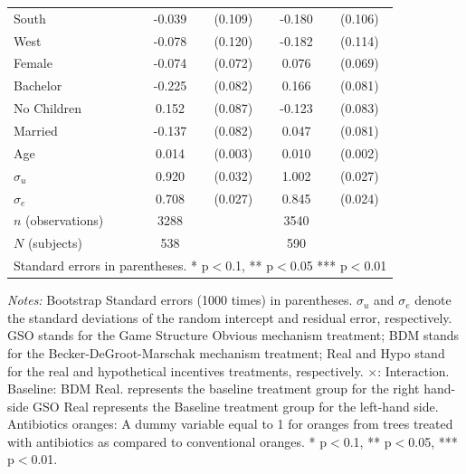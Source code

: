 \documentclass[12pt]{article}
\newcommand{\sym}[1]{\rlap{$^{#1}$}}
\begin{document}
\begin{table}[H]
{\begin{tabular}{l*{2}{cc}}
South       &      -0.039         &     (0.109)&	-0.180\sym{*}  &     (0.106)\\
West        &      -0.078         &     (0.120)&	-0.182         &     (0.114)\\
Female      &      -0.074         &     (0.072)&	0.076         &     (0.069)\\
Bachelor    &      -0.225\sym{***}&     (0.082)&	0.166\sym{**} &     (0.081)\\
No Children &       0.152\sym{*}  &     (0.087)&	-0.123         &     (0.083)\\
Married     &      -0.137\sym{*}  &     (0.082)&	0.047         &     (0.081)\\
Age         &       0.014\sym{***}&     (0.003)&	0.010\sym{***}&     (0.002)\\
$\sigma_u$     &       0.920\sym{***}&     (0.032)&	1.002\sym{***}&     (0.027)\\
$\sigma_e$   &       0.708\sym{***}&     (0.027)&	0.845\sym{***}&     (0.024)\\
\hline
\(n\) (observations)    &        3288         &            &        3540         &            \\
\(N\) (subjects)      &        538         &            &        590         &            \\
\hline \hline
\multicolumn{5}{l}{\footnotesize Standard errors in parentheses. * p$<$0.1, ** p$<$0.05 *** p$<$0.01}\\
\end{tabular}
}

\begin{tablenotes}
            \footnotesize
           \item \textit{Notes:} Bootstrap Standard errors (1000 times) in parentheses. $\sigma_u$ and $\sigma_e$ denote the standard deviations of the random intercept and residual error, respectively. GSO stands for the Game Structure Obvious mechanism treatment; BDM stands for the Becker-DeGroot-Marschak mechanism treatment; Real and Hypo stand for the real and hypothetical incentives treatments, respectively. $\times$: Interaction. Baseline: BDM Real. represents the baseline treatment group for the right hand-side GSO Real represents the Baseline treatment group for the left-hand side. Antibiotics oranges: A dummy variable equal to 1 for oranges from trees treated with antibiotics as compared to conventional oranges. * p$<$0.1, ** p$<$0.05, *** p$<$0.01.
        \end{tablenotes}
\end{table}
\end{document}
